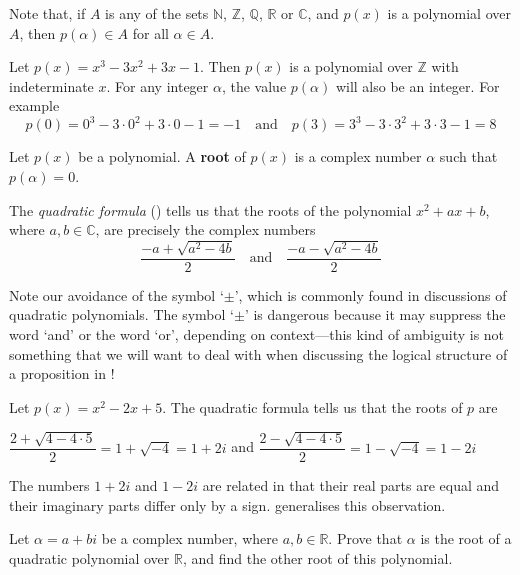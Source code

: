 Note that, if $A$ is any of the sets $\mathbb{N}$, $\mathbb{Z}$, $\mathbb{Q}$, $\mathbb{R}$ or $\mathbb{C}$, and $p(x)$ is a polynomial over $A$, then $p(\alpha) \in A$ for all $\alpha \in A$.

\begin{example}
Let $p(x)=x^3-3x^2+3x-1$. Then $p(x)$ is a polynomial over $\mathbb{Z}$ with indeterminate $x$. For any integer $\alpha$, the value $p(\alpha)$ will also be an integer. For example
\[ p(0) = 0^3-3 \cdot 0^2 + 3 \cdot 0 - 1 = -1 \quad \text{and} \quad p(3) = 3^3 - 3 \cdot 3^2 + 3 \cdot 3 - 1 = 8 \]
\end{example}

\begin{definition}
\label{defRootOfPolynomial}
Let $p(x)$ be a polynomial. A \textbf{root} of $p(x)$ is a complex number $\alpha$ such that $p(\alpha)=0$.
\end{definition}

The \textit{quadratic formula} () tells us that the roots of the polynomial $x^2+ax+b$, where $a,b \in \mathbb{C}$, are precisely the complex numbers
\[ \frac{-a+\sqrt{a^2-4b}}{2} \quad \text{and} \quad \frac{-a-\sqrt{a^2-4b}}{2} \]

Note our avoidance of the symbol `$\pm$', which is commonly found in discussions of quadratic polynomials. The symbol `$\pm$' is dangerous because it may suppress the word `and' or the word `or', depending on context---this kind of ambiguity is not something that we will want to deal with when discussing the logical structure of a proposition in !

\begin{example}
\label{exApplicationOfQuadraticFormula}
Let $p(x)=x^2-2x+5$. The quadratic formula tells us that the roots of $p$ are
\begin{center}
$\dfrac{2 + \sqrt{4 - 4 \cdot 5}}{2} = 1 + \sqrt{-4} = 1+2i$
\quad and \quad
$\dfrac{2 - \sqrt{4 - 4 \cdot 5}}{2} = 1-\sqrt{-4} = 1-2i$
\end{center}
The numbers $1+2i$ and $1-2i$ are related in that their real parts are equal and their imaginary parts differ only by a sign.  generalises this observation.
\end{example}

\begin{exercise}
\label{exComplexNumberAsRootOfQuadraticOverR}
Let $\alpha = a+bi$ be a complex number, where $a,b \in \mathbb{R}$. Prove that $\alpha$ is the root of a quadratic polynomial over $\mathbb{R}$, and find the other root of this polynomial.
\end{exercise}

